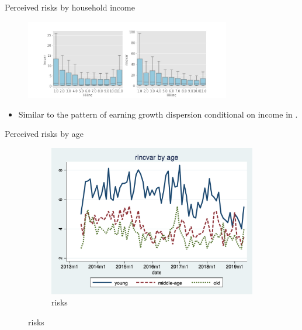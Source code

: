 \documentclass{beamer}
\begin{document}
\begin{frame}{Perceived risks by household income}
\begin{figure}
	\centering
	\label{boxplot_hhinc}
	\includegraphics[width=0.8\textwidth]{figures/boxplot_var_HHinc}
\end{figure}
	\begin{itemize}
	\item Similar to the pattern of earning growth dispersion conditional on income in \cite{bloom2018great}. 
\end{itemize}
\end{frame}



\begin{frame}{Perceived risks by age}
	\begin{figure}[ht]
		\label{ts_incvar_age_g_mean}
		\begin{subfigure}[b]{0.46\textwidth}
			\centering
			\caption{risks}
			\includegraphics[width=\textwidth, height = 0.33\textheight]{figures/ts_rincvar_age_g_median.png}
		\end{subfigure}
	\end{figure}
 \end{frame}
\end{document}
